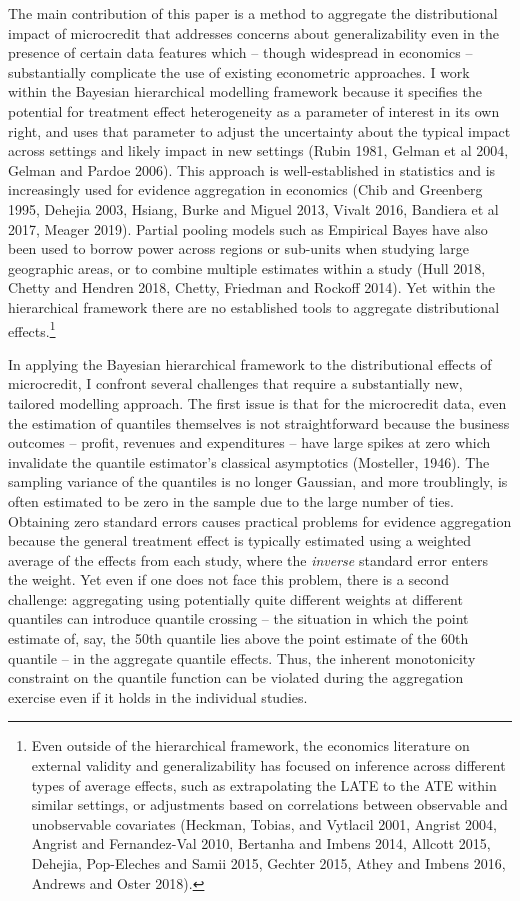 \documentclass[english,12pt]{article}\usepackage{lmodern}
\numberwithin{equation}{section}
\begin{document}
The main contribution of this paper is a method to aggregate the distributional impact of microcredit that addresses concerns about generalizability even in the presence of certain data features which -- though widespread in economics -- substantially complicate the use of existing econometric approaches. I work within the Bayesian hierarchical modelling framework because it specifies the potential for treatment effect heterogeneity as a parameter of interest in its own right, and uses that parameter to adjust the uncertainty about the typical impact across settings and likely impact in new settings (Rubin 1981, Gelman et al 2004, Gelman and Pardoe 2006). This approach is well-established in statistics and is increasingly used for evidence aggregation in economics (Chib and Greenberg 1995, Dehejia 2003, Hsiang, Burke and Miguel 2013, Vivalt 2016, Bandiera et al 2017, Meager 2019). Partial pooling models such as Empirical Bayes have also been used to borrow power across regions or sub-units when studying large geographic areas, or to combine multiple estimates within a study (Hull 2018, Chetty and Hendren 2018, Chetty, Friedman and Rockoff 2014). Yet within the hierarchical framework there are no established tools to aggregate distributional effects.\footnote{Even outside of the hierarchical framework, the economics literature on external validity and generalizability has focused on inference across different types of average effects, such as extrapolating the LATE to the ATE within similar settings, or adjustments based on correlations between observable and unobservable covariates (Heckman, Tobias, and Vytlacil 2001, Angrist 2004,  Angrist and Fernandez-Val 2010, Bertanha and Imbens 2014, Allcott 2015, Dehejia, Pop-Eleches and Samii 2015, Gechter 2015, Athey and Imbens 2016, Andrews and Oster 2018). }

In applying the Bayesian hierarchical framework to the distributional effects of microcredit, I confront several challenges that require a substantially new, tailored modelling approach. The first issue is that for the microcredit data, even the estimation of quantiles themselves is not straightforward because the business outcomes -- profit, revenues and expenditures -- have large spikes at zero which invalidate the quantile estimator's classical asymptotics (Mosteller, 1946). The sampling variance of the quantiles is no longer Gaussian, and more troublingly, is often estimated to be zero in the sample due to the large number of ties. Obtaining zero standard errors causes practical problems for evidence aggregation because the general treatment effect is typically estimated using a weighted average of the effects from each study, where the \emph{inverse} standard error enters the weight. Yet even if one does not face this problem, there is a second challenge: aggregating using potentially quite different weights at different quantiles can introduce quantile crossing -- the situation in which the point estimate of, say, the 50th quantile lies above the point estimate of the 60th quantile --  in the aggregate quantile effects. Thus, the inherent monotonicity constraint on the quantile function can be violated during the aggregation exercise even if it holds in the individual studies. 
\end{document}
